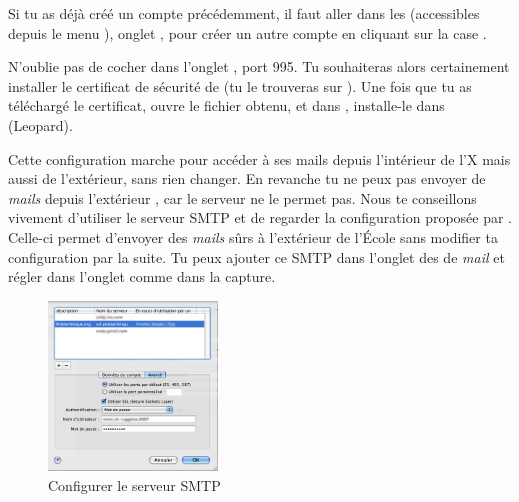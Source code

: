 Si tu as d\'ej\`a  cr\'e\'e un compte pr\'ec\'edemment, il faut aller dans les  (accessibles depuis le menu ), onglet , pour cr\'eer un autre compte en cliquant sur la case \menu{+}.

N'oublie pas de cocher  dans l'onglet , port 995. Tu souhaiteras alors certainement installer le certificat de s\'ecurit\'e de  (tu le trouveras sur ). Une fois que tu as t\'el\'echarg\'e le certificat, ouvre le fichier  obtenu, et dans , installe-le dans %
 (Leopard).

Cette configuration marche pour acc\'eder \`a  ses mails depuis l'int\'erieur de l'X mais aussi de l'ext\'erieur, sans rien changer. En revanche tu ne peux pas envoyer de \emph{mails} depuis l'ext\'erieur , car le serveur  ne le permet pas. Nous te conseillons vivement d'utiliser le serveur SMTP  et de regarder la configuration propos\'ee par . Celle-ci permet d'envoyer des \emph{mails} s\^urs \`a  l'ext\'erieur de l'\'Ecole sans modifier ta configuration par la suite. Tu peux ajouter ce SMTP dans l'onglet  des  de \emph{mail} et r\'egler dans l'onglet  comme dans la capture.

\begin{figure}[!hl]
    \begin{center}
	      \includegraphics[width=0.4\textwidth]{images/mac_config_smtp_poltechnique.png} 
      \caption{Configurer le serveur SMTP }
    \end{center}
  \end{figure}


